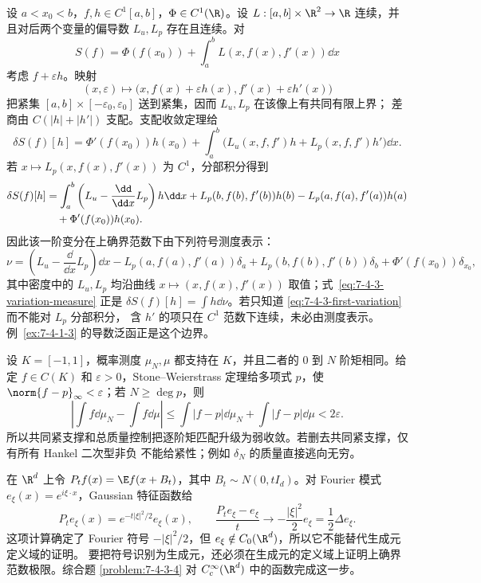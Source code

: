 \begin{example}[变分到测度]\label{ex:7-4-3-1}
设 $a<x_0<b$，$f,h\in C^1[a,b]$，$\Phi\in C^1(\R)$。设
$L:[a,b]\times\R^2\to\R$ 连续，并且对后两个变量的偏导数 $L_u,L_p$ 存在且连续。对
\[
 S(f)=\Phi(f(x_0))+\int_a^bL(x,f(x),f'(x))\dd x
\]
考虑 $f+\varepsilon h$。映射
\[
 (x,\varepsilon)\longmapsto
 \bigl(x,f(x)+\varepsilon h(x),f'(x)+\varepsilon h'(x)\bigr)
\]
把紧集 $[a,b]\times[-\varepsilon_0,\varepsilon_0]$ 送到紧集，因而 $L_u,L_p$ 在该像上有共同有限上界；
差商由 $C(|h|+|h'|)$ 支配。支配收敛定理给
\begin{equation}\label{eq:7-4-3-first-variation}
 \delta S(f)[h]
 =\Phi'(f(x_0))h(x_0)
 +\int_a^b\bigl(L_u(x,f,f')h+L_p(x,f,f')h'\bigr)\dd x.
\end{equation}
若 $x\mapsto L_p(x,f(x),f'(x))$ 为 $C^1$，分部积分得到
\begin{align}\label{eq:7-4-3-variation-measure}
 \delta S(f)[h]
 &=\int_a^b\left(L_u-\frac{\dd}{\dd x}L_p\right)h\dd x
 +L_p(b,f(b),f'(b))h(b)-L_p(a,f(a),f'(a))h(a)\notag\\
 &\quad+\Phi'(f(x_0))h(x_0).
\end{align}
因此该一阶变分在上确界范数下由下列符号测度表示：
\[
 \nu=\left(L_u-\frac{\dd}{\dd x}L_p\right)\dd x
      -L_p(a,f(a),f'(a))\delta_a
      +L_p(b,f(b),f'(b))\delta_b
      +\Phi'(f(x_0))\delta_{x_0},
\]
其中密度中的 $L_u,L_p$ 均沿曲线
$x\mapsto(x,f(x),f'(x))$ 取值；式~\eqref{eq:7-4-3-variation-measure} 正是
$\delta S(f)[h]=\int h\dd\nu$。若只知道 \eqref{eq:7-4-3-first-variation} 而不能对 $L_p$ 分部积分，
含 $h'$ 的项只在 $C^1$ 范数下连续，未必由测度表示。例~\ref{ex:7-4-1-3} 的导数泛函正是这个边界。
\end{example}

\begin{example}[矩到弱星极限]\label{ex:7-4-3-2}
设 $K=[-1,1]$，概率测度 $\mu_N,\mu$ 都支持在 $K$，并且二者的 $0$ 到 $N$ 阶矩相同。给定
$f\in C(K)$ 和
$\varepsilon>0$，Stone--Weierstrass 定理给多项式 $p$，使
$\norm{f-p}_\infty<\varepsilon$；若 $N\ge\deg p$，则
\[
 \left|\int f\dd\mu_N-\int f\dd\mu\right|
 \le\int|f-p|\dd\mu_N+\int|f-p|\dd\mu<2\varepsilon.
\]
所以共同紧支撑和总质量控制把逐阶矩匹配升级为弱收敛。若删去共同紧支撑，仅有所有 Hankel 二次型非负
不能给紧性；例如 $\delta_N$ 的质量直接逃向无穷。
\end{example}

\begin{example}[半群到生成元]\label{ex:7-4-3-3}
在 $\R^d$ 上令 $P_tf(x)=\E f(x+B_t)$，其中 $B_t\sim N(0,tI_d)$。对 Fourier 模式
$e_\xi(x)=e^{i\xi\cdot x}$，Gaussian 特征函数给
\[
 P_te_\xi(x)=e^{-t|\xi|^2/2}e_\xi(x),
 \qquad
 \frac{P_te_\xi-e_\xi}{t}\longrightarrow-\frac{|\xi|^2}{2}e_\xi
 =\frac12\Delta e_\xi.
\]
这项计算确定了 Fourier 符号 $-|\xi|^2/2$，但 $e_\xi\notin C_0(\R^d)$，所以它不能替代生成元定义域的证明。
要把符号识别为生成元，还必须在生成元的定义域上证明上确界范数极限。综合题
\ref{problem:7-4-3-4} 对 $C_c^\infty(\R^d)$ 中的函数完成这一步。
\end{example}

